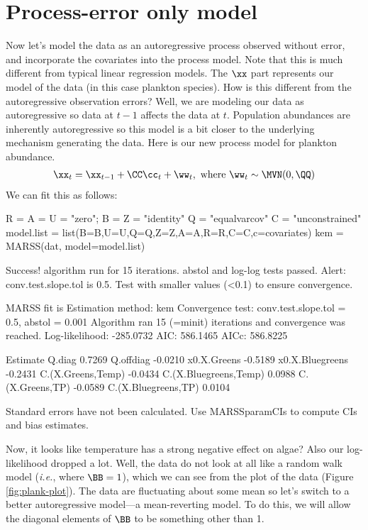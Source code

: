 \section{Process-error only model}
Now let's model the data as an autoregressive process observed without error, and incorporate the  covariates into the process model.  Note that this is much different from typical linear regression models. The $\xx$ part represents our model of the data (in this case plankton species).  How is this different from the autoregressive observation errors? Well, we are modeling our data as autoregressive so data at $t-1$ affects the data at $t$.  Population abundances are inherently autoregressive so this model is a bit closer to the underlying mechanism generating the data.  Here is our new process model for plankton abundance.
\begin{equation}
\begin{gathered}
\xx_t = \xx_{t-1} +  \CC\cc_t + \ww_t, \text{ where } \ww_t \sim \MVN(0,\QQ) 
\end{gathered}
\end{equation}
We can fit this as follows:
\begin{Schunk}
\begin{Sinput}
 R = A = U = "zero"; B = Z = "identity"
 Q = "equalvarcov"
 C = "unconstrained"
 model.list = list(B=B,U=U,Q=Q,Z=Z,A=A,R=R,C=C,c=covariates)
 kem = MARSS(dat, model=model.list)
\end{Sinput}
\begin{Soutput}
Success! algorithm run for 15 iterations. abstol and log-log tests passed.
Alert: conv.test.slope.tol is 0.5.
Test with smaller values (<0.1) to ensure convergence.

MARSS fit is
Estimation method: kem 
Convergence test: conv.test.slope.tol = 0.5, abstol = 0.001
Algorithm ran 15 (=minit) iterations and convergence was reached. 
Log-likelihood: -285.0732 
AIC: 586.1465   AICc: 586.8225   
 
                      Estimate
Q.diag                  0.7269
Q.offdiag              -0.0210
x0.X.Greens            -0.5189
x0.X.Bluegreens        -0.2431
C.(X.Greens,Temp)      -0.0434
C.(X.Bluegreens,Temp)   0.0988
C.(X.Greens,TP)        -0.0589
C.(X.Bluegreens,TP)     0.0104

Standard errors have not been calculated. 
Use MARSSparamCIs to compute CIs and bias estimates.
\end{Soutput}
\end{Schunk}
Now, it looks like temperature has a strong negative effect on algae?  Also our log-likelihood dropped a lot.  Well, the data do not look at all like a random walk model (\emph{i.e.}, where $\BB=1$), which we can see from the plot of the data (Figure \ref{fig:plank-plot}).  The data are fluctuating about some mean so let's switch to a better autoregressive model---a mean-reverting model.  To do this, we will allow the diagonal elements of $\BB$ to be something other than 1.
